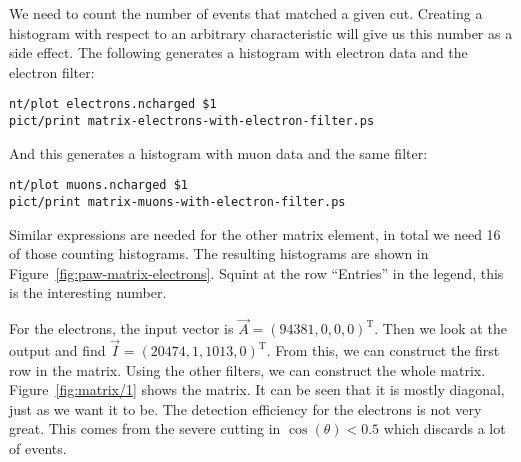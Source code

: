 \documentclass[11pt, english, fleqn, DIV=15, headinclude, BCOR=2cm]{scrreprt}
\begin{document}
We need to count the number of events that matched a given cut. Creating a
histogram with respect to an arbitrary characteristic will give us this number
as a side effect. The following generates a histogram with electron data and
the electron filter:

\begin{lstlisting}
nt/plot electrons.ncharged $1
pict/print matrix-electrons-with-electron-filter.ps
\end{lstlisting}

And this generates a histogram with muon data and the same filter:

\begin{lstlisting}
nt/plot muons.ncharged $1
pict/print matrix-muons-with-electron-filter.ps
\end{lstlisting}

Similar expressions are needed for the other matrix element, in total we need
16 of those counting histograms. The resulting histograms are shown in
Figure~\ref{fig:paw-matrix-electrons}. Squint at the row \enquote{Entries} in
the legend, this is the interesting number.

For the electrons, the input vector is $\vec A = (94381, 0, 0,
0)^\mathrm T$. Then we look at the output and find $\vec I = (20474, 1, 1013,
0)^\mathrm T$. From this, we can construct the first row in the matrix. Using
the other filters, we can construct the whole matrix. Figure~\ref{fig:matrix/1}
shows the matrix. It can be seen that it is mostly diagonal, just as we want it
to be. The detection efficiency for the electrons is not very great. This comes
from the severe cutting in $\cos(\theta) < 0.5$ which discards a lot of events.

\end{document}
